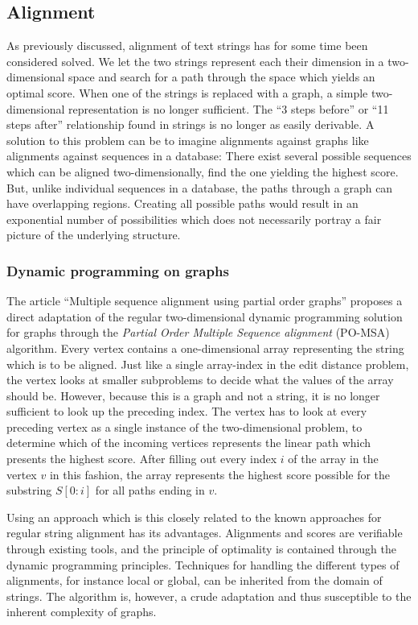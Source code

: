 \documentclass[thesis.tex]{subfiles}
\begin{document}
\subsection{Alignment}
As previously discussed, alignment of text strings has for some time been considered solved. We let the two strings represent each their dimension in a two-dimensional space and search for a path through the space which yields an optimal score. When one of the strings is replaced with a graph, a simple two-dimensional representation is no longer sufficient. The ``3 steps before'' or ``11 steps after'' relationship found in strings is no longer as easily derivable. A solution to this problem can be to imagine alignments against graphs like alignments against sequences in a database: There exist several possible sequences which can be aligned two-dimensionally, find the one yielding the highest score. But, unlike individual sequences in a database, the paths through a graph can have overlapping regions. Creating all possible paths would result in an exponential number of possibilities which does not necessarily portray a fair picture of the underlying structure.
\subsubsection{Dynamic programming on graphs}
\label{sec:dp_on_graphs}
The article ``Multiple sequence alignment using partial order graphs'' \cite{multiple_sequence_alignment_using_partial_order_graphs} proposes a direct adaptation of the regular two-dimensional dynamic programming solution for graphs through the \textit{Partial Order Multiple Sequence alignment} (PO-MSA) algorithm. Every vertex contains a one-dimensional array representing the string which is to be aligned. Just like a single array-index in the edit distance problem, the vertex looks at smaller subproblems to decide what the values of the array should be. However, because this is a graph and not a string, it is no longer sufficient to look up the preceding index. The vertex has to look at every preceding vertex as a single instance of the two-dimensional problem, to determine which of the incoming vertices represents the linear path which presents the highest score. After filling out every index $i$ of the array in the vertex $v$ in this fashion, the array represents the highest score possible for the substring $S[0:i]$ for all paths ending in $v$.\\
\par\noindent
Using an approach which is this closely related to the known approaches for regular string alignment has its advantages. Alignments and scores are verifiable through existing tools, and the principle of optimality is contained through the dynamic programming principles. Techniques for handling the different types of alignments, for instance local or global, can be inherited from the domain of strings. The algorithm is, however, a crude adaptation and thus susceptible to the inherent complexity of graphs.
\label{sec:po_msa}
\end{document}
